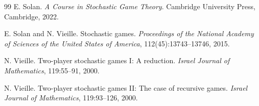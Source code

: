 \documentclass[11pt]{article}
\theoremstyle{definition}
\newcommand{\1}{\mathbf{1}}
\begin{document}
\begin{thebibliography}{99}
E. Solan.
\newblock \emph{A Course in Stochastic Game Theory}.
\newblock Cambridge University Press, Cambridge, 2022.

E. Solan and N. Vieille.
\newblock Stochastic games.
\newblock \emph{Proceedings of the National Academy of Sciences of the United States of America}, 112(45):13743--13746, 2015.

N. Vieille.
\newblock Two-player stochastic games {I}: A reduction.
\newblock \emph{Israel Journal of Mathematics}, 119:55--91, 2000.

N. Vieille.
\newblock Two-player stochastic games {II}: The case of recursive games.
\newblock \emph{Israel Journal of Mathematics}, 119:93--126, 2000.

\end{thebibliography}
\end{document}
